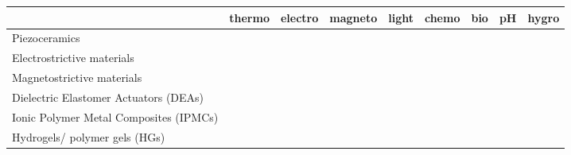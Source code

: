 \documentclass{article}
\begin{document}
\fancyhead[L]{}
\fancyhead[R]{}

\begin{landscape}
	\begin{table}[htbp]
		\small
		\begin{tabular}{|p{3.4cm}|p{1.5cm}|p{1.5cm}|p{1.5cm}|p{1.5cm}|p{1.5cm}|p{1.5cm}|p{1.5cm}|p{1.5cm}|}
			\hline
			& thermo 
			& electro 
			& magneto 
			& light
			& chemo
			& bio
			& pH
			& hygro  \\
			\hline
			\raggedright Piezoceramics 
			& \cite{Wang1998} 
			& \cellcolor{myLightGray} \cite{Jaffe1958,Tressler1998,Gao2020,Hall2001,Humer2015,Smith2003,Acosta2017,Li2010,Bowen2014}
			& \cite{Kozielski2012,Guiffard2010,Lin2010,Tang2012} 
			&  
			&  
			& 
			&  
			& \cite{Lipscomb2009,Weaver2012}   \\
			\hline
			Electrostrictive materials 
			&  
			& \cellcolor{myLightGray} \cite{Chopra2013_ch6_magnetostrictives_and_electrostrictives,Mason1948,Kirkby1981}  
			&  
			&  
			&  
			&  
			&  
			&    \\
			\hline
			Magnetostrictive materials 
			&  \cite{Anjanappa1994,Chen2023a,Zhu2014}
			&  
			&  \cellcolor{myLightGray} \cite{Chopra2013_ch6_magnetostrictives_and_electrostrictives,Singh2022b} 
			&  
			&  
			&  
			&  
			&  \\
			\hline
			Dielectric Elastomer Actuators (DEAs)
			&  \cite{Kleo2020}
			&  \cellcolor{myLightGray} \cite{Anderson2012,Henke2017,Franke2020,Keplinger2013,Mitchell2019}
			&  
			&  
			&  
			&  
			&  
			&    \\
			\hline
			\raggedright Ionic Polymer Metal Composites (IPMCs)
			& \cite{Johnson2008,Lughmani2009,Brunetto2009,Wang2021a,Brunetto2011}
			&  \cellcolor{myLightGray} \cite{NematNasser2001,Akle2011,Ulbricht2022,Porfiri2008,Shahinpoor2001,Shahinpoor2004,Kruusamaee2015,Jo2013}
			& \cite{Chang2018}
			&  
			&  
			&  
			&  
			& \cite{Brunetto2009,Wang2021a,Brunetto2011}  \\
			\hline
			Hydrogels/ polymer gels (HGs)
			&  \cellcolor{myLightGray} \cite{Ehrenhofer2016permeation,Xue2024,Kim2017,Ding2016} 
			&  \cellcolor{myLightGray} \cite{Leichsenring2017,Grimshaw1990,Attaran2015,Ballhause2008} %
			&  \cellcolor{myLightGray} \cite{Kuo2014,Zrinyi1997,Sivudu2009,Raikher2003,Tian2024}  %

\end{tabular}
\end{table}
\end{landscape}
\end{document}
